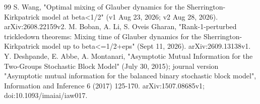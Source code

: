 \documentclass[11pt]{article}
\begin{document}
\begin{thebibliography}{99}
 S. Wang, "Optimal mixing of Glauber dynamics for the Sherrington-Kirkpatrick model at beta<1/2" (v1 Aug 23, 2026; v2 Aug 28, 2026). arXiv:2608.22159v2.
 M. Boban, A. Li, S. Oveis Gharan, "Rank-1-perturbed trickledown theorems: Mixing time of Glauber dynamics for the Sherrington-Kirkpatrick model up to beta<=1/2+eps" (Sept 11, 2026). arXiv:2609.13138v1.
 Y. Deshpande, E. Abbe, A. Montanari, "Asymptotic Mutual Information for the Two-Groups Stochastic Block Model" (July 30, 2015); journal version "Asymptotic mutual information for the balanced binary stochastic block model", Information and Inference 6 (2017) 125-170. arXiv:1507.08685v1; doi:10.1093/imaiai/iaw017.
\end{thebibliography}
\space%
\end{document}

